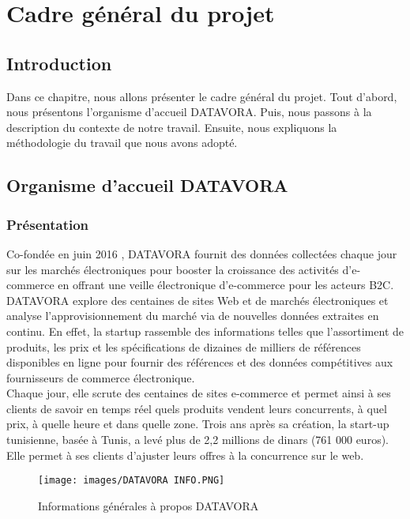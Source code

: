 \chapter{Cadre général du projet}
\section*{Introduction}
Dans ce chapitre, nous allons présenter le cadre général du projet. Tout d’abord, nous présentons l’organisme d’accueil DATAVORA. Puis, nous passons à la description du contexte de notre travail. Ensuite, nous expliquons la méthodologie du travail que nous avons adopté.


\section {Organisme d’accueil DATAVORA}
\subsection{Présentation}
Co-fondée en juin 2016 \cite{datavora}, DATAVORA fournit des données collectées chaque jour sur les marchés électroniques pour booster la croissance des activités d'e-commerce en offrant une veille électronique d'e-commerce pour les acteurs B2C. \\
DATAVORA explore des centaines de sites Web et de marchés électroniques et analyse l'approvisionnement du marché via de nouvelles données extraites en continu.
En effet, la startup rassemble des informations telles que l'assortiment de produits, les prix et les spécifications de dizaines de milliers de références disponibles en ligne pour fournir des références et des données compétitives aux fournisseurs de commerce électronique.\\
Chaque jour, elle scrute des centaines de sites e-commerce et permet ainsi à ses clients de savoir en temps réel quels produits vendent leurs concurrents, à quel prix, à quelle heure et dans quelle zone.
Trois ans après sa création, la start-up tunisienne, basée à Tunis, a levé plus de 2,2 millions de dinars (761 000 euros). Elle permet à ses clients d’ajuster leurs offres à la concurrence sur le web.
  

\begin{figure}[H]
\centering
\texttt{[image: images/DATAVORA INFO.PNG]}
\caption{Informations générales à propos DATAVORA \cite{datavora}}
\label{fig:Mod-Enseig}
\end{figure}
